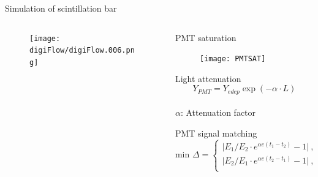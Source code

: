 \documentclass[compress, 13pt, aspectratio=169]{beamer}
\begin{document}
\begin{frame}{Simulation of scintillation bar}
    \begin{columns}
        \begin{column}{0.5\textwidth}
            \begin{figure}[t]
                \texttt{[image: digiFlow/digiFlow.006.png]}%
            \end{figure}
        \end{column}
        \begin{column}{0.5\textwidth}
            \pause
            \vspace*{-0.3cm}
            \begin{block}{\small PMT saturation\footnotemark}
                \begin{figure}[t]
                    \texttt{[image: PMTSAT]}%
                \end{figure}
            \end{block}
            \pause
            \vspace*{-0.2cm}
            \begin{block}{\small Light attenuation}
            \vspace*{-0.2cm}
            {
                \small$$Y_{PMT} = Y_{edep} \exp (-\alpha \cdot L)$$
            }
            \vspace*{-0.7cm}\\
            {\footnotesize$\alpha$: Attenuation factor}
            \end{block}
            \pause
            \vspace*{-0.2cm}
            \begin{block}{\small PMT signal matching}
            {
                \small
                \vspace*{-0.5cm}
                $$\text{min }\Delta = 
                \begin{cases}
                    \lvert E_1/E_2 \cdot e^{\alpha c (t_1-t_2)} -1\rvert\ ,& t_1>t_2\\
                    \lvert E_2/E_1 \cdot e^{\alpha c (t_2-t_1)} -1\rvert\ ,& t_2>t_1\\
                \end{cases}$$
            }
            \end{block}
        \end{column}
    \end{columns}
\end{frame}
\end{document}
